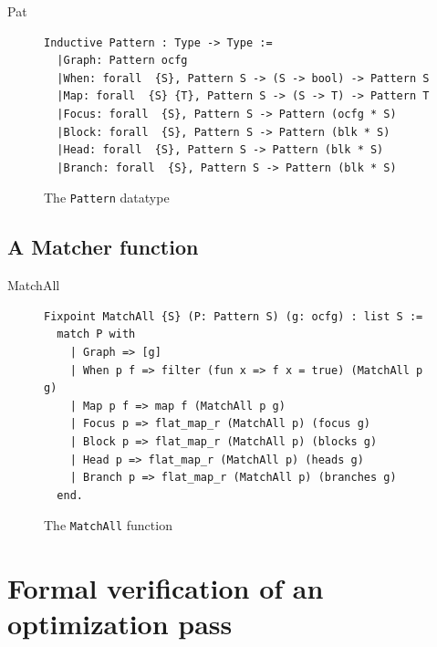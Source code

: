 \documentclass{beamer}
\newcommand{\inlinecoq}[1]{\mbox{\lstinline[style=customcoq,columns=fixed,basewidth=.48em]{#1}}}
\newcommand{\ilc}[1]{\inlinecoq{#1}}
\newcommand{\leon}[1]{\textcolor{blue}{#1}}
\begin{document}
\begin{frame}[fragile]{Pat}
  \begin{figure}
    \begin{lstlisting}[style=customcoq,basicstyle=\small\ttfamily]
Inductive Pattern : Type -> Type :=
  |Graph: Pattern ocfg
  |When: forall  {S}, Pattern S -> (S -> bool) -> Pattern S
  |Map: forall  {S} {T}, Pattern S -> (S -> T) -> Pattern T
  |Focus: forall  {S}, Pattern S -> Pattern (ocfg * S)
  |Block: forall  {S}, Pattern S -> Pattern (blk * S)
  |Head: forall  {S}, Pattern S -> Pattern (blk * S)
  |Branch: forall  {S}, Pattern S -> Pattern (blk * S)
  \end{lstlisting}
    \caption{The \ilc{Pattern} datatype}
    \label{fig:pat}
  \end{figure}
\end{frame}

\subsection*{A Matcher function}

\begin{frame}[fragile]{MatchAll}
  \begin{figure}
    \begin{lstlisting}[style=customcoq,basicstyle=\small\ttfamily]
Fixpoint MatchAll {S} (P: Pattern S) (g: ocfg) : list S :=
  match P with
    | Graph => [g]
    | When p f => filter (fun x => f x = true) (MatchAll p g) 
    | Map p f => map f (MatchAll p g)
    | Focus p => flat_map_r (MatchAll p) (focus g)
    | Block p => flat_map_r (MatchAll p) (blocks g)
    | Head p => flat_map_r (MatchAll p) (heads g)
    | Branch p => flat_map_r (MatchAll p) (branches g)
  end.
  \end{lstlisting}
    \caption{The \ilc{MatchAll} function}
    \label{fig:matchall}
  \end{figure}
\end{frame}

\section{Formal verification of an optimization pass}

\end{document}
